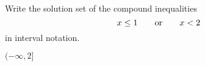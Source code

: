 

Write the solution set of the compound inequalities
\[x\leq 1\text{\quad\quad or\quad\quad}  x <2 \]
in interval notation.

\begin{solution}
$(-\infty, 2]$
\end{solution}